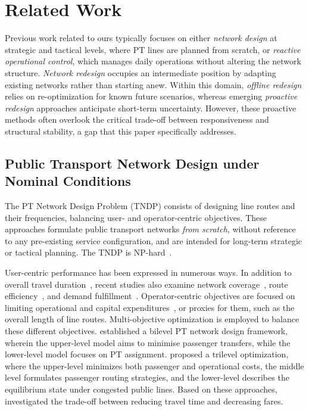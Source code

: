 \documentclass[a4paper,fleqn]{cas-sc}
\begin{document}
\section{Related Work}\label{sec:relatedWork}

Previous work related to ours typically focuses on either \textit{network design} at strategic and tactical levels, where PT lines are planned from scratch, or \textit{reactive operational control}, which manages daily operations without altering the network structure.
\textit{Network redesign} occupies an intermediate position by adapting existing networks rather than starting anew.
Within this domain, \textit{offline redesign} relies on re-optimization for known future scenarios, whereas emerging \textit{proactive redesign} approaches anticipate short-term uncertainty.
However, these proactive methods often overlook the critical trade-off between responsiveness and structural stability, a gap that this paper specifically addresses.

\subsection{Public Transport Network Design under Nominal Conditions}
\label{sec:preventive}

The PT Network Design Problem (TNDP) consists of designing line routes and their frequencies, balancing user- and operator-centric objectives. These approaches formulate public transport networks \emph{from scratch}, without reference to any pre-existing service configuration, and are intended for long-term strategic or tactical planning.
The TNDP is NP-hard~\citep{magnanti1984network}.

User-centric performance has been expressed in numerous ways. In addition to overall travel duration~\citep{john2014improved,heyken2019adaptive}, recent studies also examine network coverage~\citep{cadarso2017rapid}, route efficiency~\citep{suman2019improvement}, and demand fulfillment~\citep{barahimi2021multi}. Operator-centric objectives are focused on limiting operational and capital expenditures~\citep{ahern2022approximate,chen2018continuum,calabro2023adaptive}, or proxies for them, such as the overall length of line routes.
%
Multi-objective optimization is employed to balance these different objectives. \citet{szeto2014transit} established a bilevel PT network design framework, wherein the upper-level model aims to minimise passenger transfers, while the lower-level model focuses on PT assignment.
\citet{tian2021service} proposed a trilevel optimization, where the upper-level minimizes both passenger and operational costs, the middle level formulates passenger routing strategies, and the lower-level describes the equilibrium state under congested public lines. 
Based on these approaches, \citet{cervantes2023analyzing} investigated the trade-off between reducing travel time and decreasing fares. 
\end{document}
